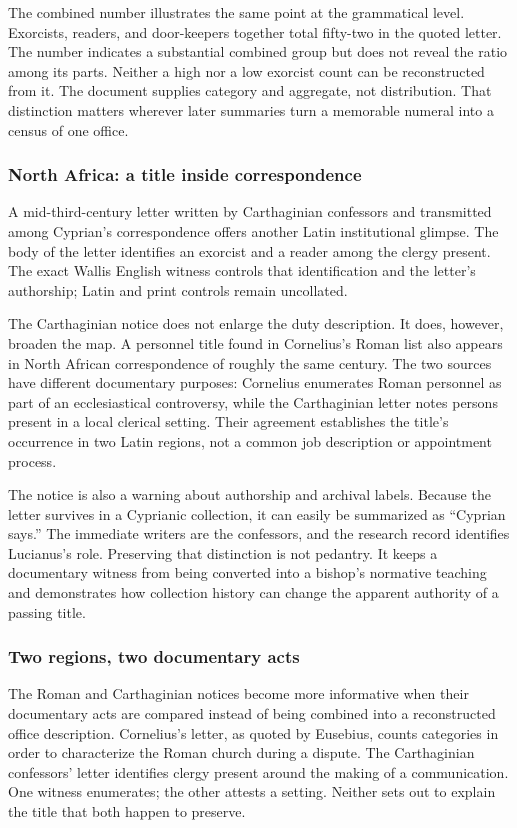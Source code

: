 The combined number illustrates the same point at the grammatical level.
Exorcists, readers, and door-keepers together total fifty-two in the quoted
letter. The number indicates a substantial combined group but does not reveal
the ratio among its parts. Neither a high nor a low exorcist count can be
reconstructed from it. The document supplies category and aggregate, not
distribution. That distinction matters wherever later summaries turn a
memorable numeral into a census of one office.

\subsubsection{North Africa: a title inside correspondence}

A mid-third-century letter written by Carthaginian confessors and transmitted
among Cyprian's correspondence offers another Latin institutional glimpse.
The body of the letter identifies an exorcist and a reader among the clergy
present. The exact Wallis English witness controls that identification and
the letter's authorship; Latin and print controls remain uncollated.

The Carthaginian notice does not enlarge the duty description. It does,
however, broaden the map. A personnel title found in Cornelius's Roman list
also appears in North African correspondence of roughly the same century.
The two sources have different documentary purposes: Cornelius enumerates
Roman personnel as part of an ecclesiastical controversy, while the
Carthaginian letter notes persons present in a local clerical setting. Their
agreement establishes the title's occurrence in two Latin regions, not a
common job description or appointment process.

The notice is also a warning about authorship and archival labels. Because the
letter survives in a Cyprianic collection, it can easily be summarized as
``Cyprian says.'' The immediate writers are the confessors, and the research
record identifies Lucianus's role. Preserving that distinction is not
pedantry. It keeps a documentary witness from being converted into a bishop's
normative teaching and demonstrates how collection history can change the
apparent authority of a passing title.

\subsubsection{Two regions, two documentary acts}

The Roman and Carthaginian notices become more informative when their
documentary acts are compared instead of being combined into a reconstructed
office description. Cornelius's letter, as quoted by Eusebius, counts
categories in order to characterize the Roman church during a dispute. The
Carthaginian confessors' letter identifies clergy present around the making
of a communication. One witness enumerates; the other attests a setting.
Neither sets out to explain the title that both happen to preserve.

